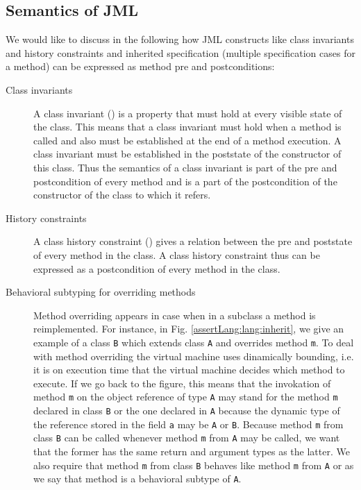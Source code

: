 \subsection{Semantics of JML} \label{javaVerif:JMLsemantics}


We would like to discuss in the following how JML constructs like class invariants and history constraints and inherited specification
(multiple specification cases for a method) can be expressed as 
method pre and postconditions:

\begin{description} 
  \item [Class invariants] A class invariant (\ClassInv)  is a property that must hold at every visible state of the class. This means that a
        class invariant must hold when a method is called and also must be established at the end of a method execution. 
	A class invariant must be established in the poststate 
	of the constructor of this class.
	Thus the semantics of
	a class invariant is part of the pre and  postcondition of every method and is a part of the postcondition of the constructor of
	the class to which it refers.
	
        
  \item [History constraints] A class history constraint (\ClassHistoryConstr) gives a relation between the pre and poststate of every method in the class. 
        A class history constraint thus can be expressed as a postcondition of every method in the class.
        
  \item [Behavioral subtyping for overriding methods]
        Method overriding appears in case when in a subclass a method is reimplemented.  For instance, in Fig. \ref{assertLang:lang:inherit},
	we give an example of a class \lstinline!B! which extends class   \lstinline!A! and overrides method  \lstinline!m!. 
	To deal with method overriding the virtual machine uses dinamically bounding, i.e. it is on execution time that the virtual machine decides which method to execute.
	If we go back to the figure, this means that the invokation of method   \lstinline!m! on the object reference of type \lstinline!A!
        may stand for the method  \lstinline!m! declared in class \lstinline!B! or the one declared in \lstinline!A! because the dynamic type of the
	reference stored in the field  \lstinline!a! may be \lstinline!A! or \lstinline!B!. Because  method \lstinline!m! from
        class \lstinline!B! can be called whenever method  \lstinline!m! from  \lstinline!A! may be called, we want that the former has the same 
	return and argument types as the latter. We also require that method \lstinline!m! from
        class \lstinline!B! behaves like method \lstinline!m! from \lstinline!A! or as we say that method is a behavioral subtype of \lstinline!A!. 
	

\end{description}
